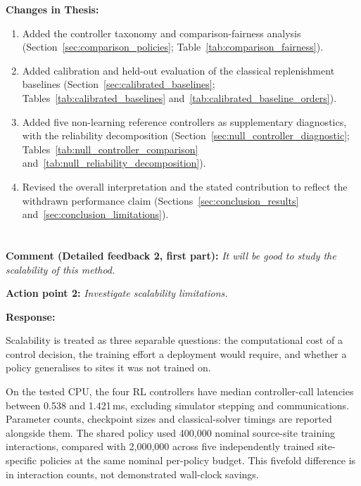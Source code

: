 \vspace{\baselineskip}

\noindent\textbf{Changes in Thesis:}
\begin{enumerate}
  \item Added the controller taxonomy and comparison-fairness analysis
        (Section~\ref{sec:comparison_policies};
        Table~\ref{tab:comparison_fairness}).
  \item Added calibration and held-out evaluation of the classical
        replenishment baselines (Section~\ref{sec:calibrated_baselines};
        Tables~\ref{tab:calibrated_baselines}
        and~\ref{tab:calibrated_baseline_orders}).
  \item Added five non-learning reference controllers as supplementary
        diagnostics, with the reliability decomposition
        (Section~\ref{sec:null_controller_diagnostic};
        Tables~\ref{tab:null_controller_comparison}
        and~\ref{tab:null_reliability_decomposition}).
  \item Revised the overall interpretation and the stated contribution to
        reflect the withdrawn performance claim
        (Sections~\ref{sec:conclusion_results}
        and~\ref{sec:conclusion_limitations}).
\end{enumerate}


\section{}
\label{sec:rebuttal_scalability}

\noindent\textbf{Comment (Detailed feedback 2, first part):} \textit{It will be
good to study the scalability of this method.}

\noindent\textbf{Action point 2:} \textit{Investigate scalability limitations.}

\vspace{\baselineskip}

\noindent\textbf{Response:}

Scalability is treated as three separable questions: the computational cost of a
control decision, the training effort a deployment would require, and whether a
policy generalises to sites it was not trained on.

On the tested CPU, the four RL controllers have median controller-call latencies
between 0.538 and 1.421\,ms, excluding simulator stepping and communications.
Parameter counts, checkpoint sizes and classical-solver timings are reported
alongside them. The shared policy used 400,000 nominal source-site
training interactions, compared with 2,000,000 across five independently
trained site-specific policies at the same nominal per-policy budget.
This fivefold difference is in interaction counts, not demonstrated
wall-clock savings.

